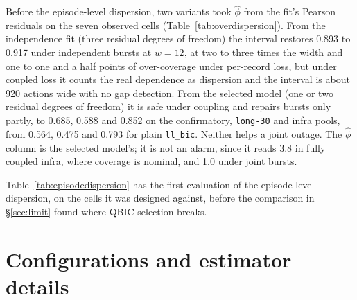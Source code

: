 \documentclass[11pt]{article}
\begin{document}
Before the episode-level dispersion, two variants took $\hat\phi$ from the fit's
Pearson residuals on the seven observed cells (Table~\ref{tab:overdispersion}).
From the independence fit (three residual degrees of freedom) the interval
restores 0.893 to 0.917 under independent bursts at $w = 12$, at two to three times
the width and one to one and a half points of over-coverage under per-record
loss, but under coupled loss it counts the real dependence as dispersion and the
interval is about 920 actions wide with no gap detection. From the selected
model (one or two residual degrees of freedom) it is safe under coupling and
repairs bursts only partly, to 0.685, 0.588 and 0.852 on the confirmatory,
\texttt{long-30} and infra pools, from 0.564, 0.475 and 0.793 for plain
\texttt{ll\_bic}. Neither helps a joint outage.
The $\hat\phi$ column is the selected model's; it is not an alarm, since it reads
3.8 in fully coupled infra, where coverage is nominal, and 1.0 under joint
bursts.

\begin{table}[h]
\centering

\caption{Quasi-Poisson intervals with the dispersion from the fit's residuals.
Post hoc.}
\label{tab:overdispersion}
\end{table}

Table~\ref{tab:episodedispersion} has the first evaluation of the
episode-level dispersion, on the cells it was designed against, before the
comparison in \S\ref{sec:limit} found where QBIC selection breaks.

\begin{table}[h]
\centering

\caption{The first evaluation of the episode-level dispersion. Post hoc; the
``quasi, episodes'' column is \texttt{ll\_qbic\_hom}.}
\label{tab:episodedispersion}
\end{table}

\section{Configurations and estimator details}
\label{app:methods}

\begin{table}[h]
\centering
\small

\caption{Loss configurations.}
\label{tab:configs}
\end{table}
\end{document}
